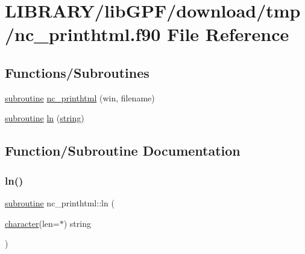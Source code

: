 \hypertarget{nc__printhtml_8f90}{}\section{L\+I\+B\+R\+A\+R\+Y/lib\+G\+P\+F/download/tmp/nc\+\_\+printhtml.f90 File Reference}
\label{nc__printhtml_8f90}
\subsection*{Functions/\+Subroutines}
\begin{DoxyCompactItemize}
\item 
\hyperlink{M__stopwatch_83_8txt_acfbcff50169d691ff02d4a123ed70482}{subroutine} \hyperlink{nc__printhtml_8f90_a32e95e7d4144cd8b7fb58ff6974441a8}{nc\+\_\+printhtml} (win, filename)
\item 
\hyperlink{M__stopwatch_83_8txt_acfbcff50169d691ff02d4a123ed70482}{subroutine} \hyperlink{nc__printhtml_8f90_a95070803517ce3fa7f43d9adcda31274}{ln} (\hyperlink{what__overview_81_8txt_a74cb7e955273b9f9157b4f0c18a38849}{string})
\end{DoxyCompactItemize}


\subsection{Function/\+Subroutine Documentation}
\mbox{\label{nc__printhtml_8f90_a95070803517ce3fa7f43d9adcda31274}} 
\subsubsection{\texorpdfstring{ln()}{ln()}}
{\footnotesize\ttfamily \hyperlink{M__stopwatch_83_8txt_acfbcff50169d691ff02d4a123ed70482}{subroutine} nc\+\_\+printhtml\+::ln (\begin{DoxyParamCaption}\item[{\hyperlink{option__stopwatch_83_8txt_abd4b21fbbd175834027b5224bfe97e66}{character}(len=$\ast$)}]{string }\end{DoxyParamCaption})}

